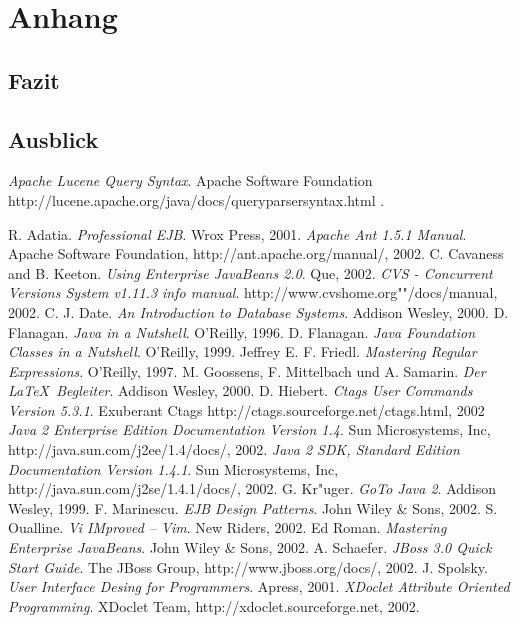 
\chapter{Anhang}
\section{Fazit}
\section{Ausblick}



\begin{thebibliography}{keine ah}

\bibitem[LucQS]{} \emph{Apache Lucene Query Syntax}. Apache Software Foundation http://lucene.apache.org/java/docs/queryparsersyntax.html .


\bibitem[Ada01]{} R. Adatia. \emph{Professional EJB}. Wrox Press, 2001.
\bibitem[Apa02]{} \emph{Apache Ant 1.5.1 Manual}. Apache Software Foundation, http://ant.apache.org/manual/, 2002.
\bibitem[Cav02]{} C. Cavaness and B. Keeton. \emph{Using Enterprise JavaBeans 2.0}. Que, 2002.
\bibitem[Cvs02]{} \emph{CVS - Concurrent Versions System v1.11.3 info manual}. http://www.cvshome.org""/docs/manual, 2002.
\bibitem[Dat00]{} C. J. Date. \emph{An Introduction to Database Systems}. Addison Wesley, 2000.
\bibitem[Fla96]{} D. Flanagan. \emph{Java in a Nutshell}. O'Reilly, 1996.
\bibitem[Fla99]{} D. Flanagan. \emph{Java Foundation Classes in a Nutshell}. O'Reilly, 1999.
\bibitem[Fri97]{} Jeffrey E. F. Friedl. \emph{Mastering Regular Expressions}. O'Reilly, 1997.
\bibitem[Goo00]{} M. Goossens, F. Mittelbach und A. Samarin. \emph{Der \LaTeX \ Begleiter}. Addison Wesley, 2000.
\bibitem[Hie02]{} D. Hiebert. \emph{Ctags User Commands Version 5.3.1}. Exuberant Ctags http://ctags.sourceforge.net/ctags.html, 2002
\bibitem[Jee02]{} \emph{Java 2 Enterprise Edition Documentation Version 1.4}.  Sun Microsystems, Inc, http://java.sun.com/j2ee/1.4/docs/, 2002.
\bibitem[Jse02]{} \emph{Java 2 SDK, Standard Edition Documentation Version 1.4.1}.  Sun Microsystems, Inc, http://java.sun.com/j2se/1.4.1/docs/, 2002.
\bibitem[Kr"u99]{} G. Kr"uger. \emph{GoTo Java 2}. Addison Wesley, 1999.
\bibitem[Mar02]{} F. Marinescu. \emph{EJB Design Patterns}. John Wiley \& Sons, 2002.
\bibitem[Oua02]{} S. Oualline. \emph{Vi IMproved -- Vim}. New Riders, 2002.
\bibitem[Rom02]{} Ed Roman. \emph{Mastering Enterprise JavaBeans}. John Wiley \& Sons, 2002.
\bibitem[Sch02]{} A. Schaefer. \emph{JBoss 3.0 Quick Start Guide}. The JBoss Group, http://www.jboss.org/docs/, 2002.
\bibitem[Spo01]{} J. Spolsky. \emph{User Interface Desing for Programmers}. Apress, 2001.
\bibitem[Xdo02]{} \emph{XDoclet Attribute Oriented Programming}. XDoclet Team, http://xdoclet.sourceforge.net, 2002.
\end{thebibliography}

